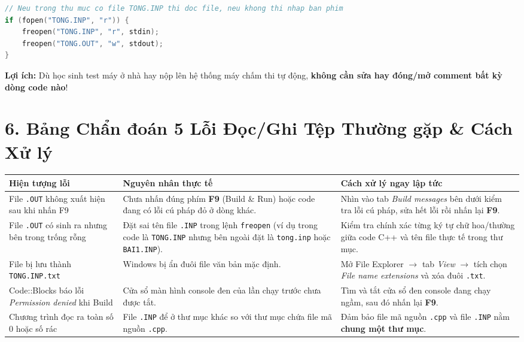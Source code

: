 \documentclass[11pt,a4paper]{article}
\begin{document}
\begin{lstlisting}[language=C++]
// Neu trong thu muc co file TONG.INP thi doc file, neu khong thi nhap ban phim
if (fopen("TONG.INP", "r")) {
    freopen("TONG.INP", "r", stdin);
    freopen("TONG.OUT", "w", stdout);
}
\end{lstlisting}
\textbf{Lợi ích:} Dù học sinh test máy ở nhà hay nộp lên hệ thống máy chấm thi tự động, \textbf{không cần sửa hay đóng/mở comment bất kỳ dòng code nào}!

\vspace{-2mm}
\section*{\color{AsianDarkBlue}\normalsize 6. Bảng Chẩn đoán 5 Lỗi Đọc/Ghi Tệp Thường gặp \& Cách Xử lý}
\begin{center}
\footnotesize
\begin{tabular}{@{}>{\raggedright\arraybackslash}p{3.8cm}>{\raggedright\arraybackslash}p{4.6cm}>{\raggedright\arraybackslash}p{7.6cm}@{}}
\toprule
\textbf{Hiện tượng lỗi} & \textbf{Nguyên nhân thực tế} & \textbf{Cách xử lý ngay lập tức} \\
\midrule
File \texttt{.OUT} không xuất hiện sau khi nhấn F9 & Chưa nhấn đúng phím \textbf{F9} (Build \& Run) hoặc code đang có lỗi cú pháp đỏ ở dòng khác. & Nhìn vào tab \textit{Build messages} bên dưới kiểm tra lỗi cú pháp, sửa hết lỗi rồi nhấn lại \textbf{F9}. \\
\addlinespace[3pt]
File \texttt{.OUT} có sinh ra nhưng bên trong trống rỗng & Đặt sai tên file \texttt{.INP} trong lệnh \texttt{freopen} (ví dụ trong code là \texttt{TONG.INP} nhưng bên ngoài đặt là \texttt{tong.inp} hoặc \texttt{BAI1.INP}). & Kiểm tra chính xác từng ký tự chữ hoa/thường giữa code C++ và tên file thực tế trong thư mục. \\
\addlinespace[3pt]
File bị lưu thành \texttt{TONG.INP.txt} & Windows bị ẩn đuôi file văn bản mặc định. & Mở File Explorer $\to$ tab \textit{View} $\to$ tích chọn \textit{File name extensions} và xóa đuôi \texttt{.txt}. \\
\addlinespace[3pt]
Code::Blocks báo lỗi \textit{Permission denied} khi Build & Cửa sổ màn hình console đen của lần chạy trước chưa được tắt. & Tìm và tắt cửa sổ đen console đang chạy ngầm, sau đó nhấn lại \textbf{F9}. \\
\addlinespace[3pt]
Chương trình đọc ra toàn số 0 hoặc số rác & File \texttt{.INP} để ở thư mục khác so với thư mục chứa file mã nguồn \texttt{.cpp}. & Đảm bảo file mã nguồn \texttt{.cpp} và file \texttt{.INP} nằm \textbf{chung một thư mục}. \\
\bottomrule
\end{tabular}
\end{center}
\end{document}
